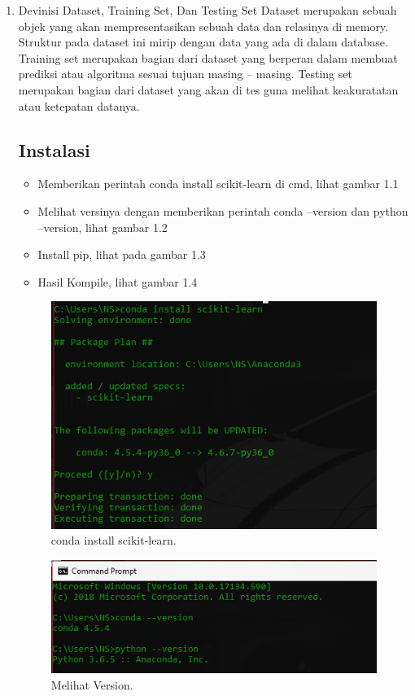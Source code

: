 \begin{enumerate}
\item
Devinisi Dataset, Training Set, Dan Testing Set
\subitem
Dataset merupakan sebuah objek yang akan mempresentasikan sebuah data dan relasinya di memory. Struktur pada dataset ini mirip dengan data yang ada di dalam database. Training set merupakan bagian dari dataset yang berperan dalam membuat prediksi atau algoritma sesuai tujuan masing – masing. Testing set merupakan bagian dari dataset yang akan di tes guna melihat keakuratatan atau ketepatan datanya.

\subsection{Instalasi}

\begin{itemize}
\item
Memberikan perintah conda install scikit-learn di cmd, lihat gambar 1.1
\item
Melihat versinya dengan memberikan perintah conda --version dan python --version, lihat gambar 1.2
\item
Install pip, lihat pada gambar 1.3
\item
Hasil Kompile, lihat gambar 1.4
\end{itemize}


\begin{figure}[ht]\centerline{\includegraphics[width=1\textwidth]{figures/32.PNG}}\caption{conda install scikit-learn.}\end{figure}

\begin{figure}[ht]\centerline{\includegraphics[width=1\textwidth]{figures/31.PNG}}\caption{Melihat Version.}\end{figure}


\end{enumerate}
